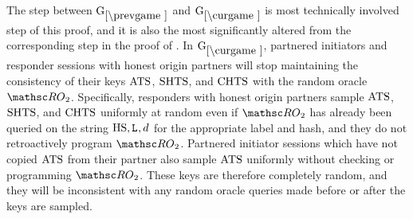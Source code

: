 \begin{collectinmacro}{\TLSProofFull}{}{}

The step between $\prevGm$ and $\curGm$ is most technically involved step of this proof, and it is also the most significantly altered from the corresponding step in the proof of \SIGMAI. 
In $\curGm$, partnered initiators and responder sessions with honest origin partners will stop maintaining the consistency of their keys $\mathrm{ATS}$, $\mathrm{SHTS}$, and $\mathrm{CHTS}$ with the random oracle $\RO_2$. 
Specifically, responders with honest origin partners sample $\mathrm{ATS}$, $\mathrm{SHTS}$, and $\mathrm{CHTS}$ uniformly at random even if $\RO_2$ has already been queried on the string $\mathrm{HS},\mathtt{L}_{},d$ for the appropriate label and hash, and they do not retroactively program $\RO_2$. Partnered initiator sessions which have not copied $\mathrm{ATS}$ from their partner also sample $\mathrm{ATS}$ uniformly without checking or programming $\RO_2$. 
These keys are therefore completely random, and they will be inconsistent with any random oracle queries made before or after the keys are sampled.


\end{collectinmacro}

